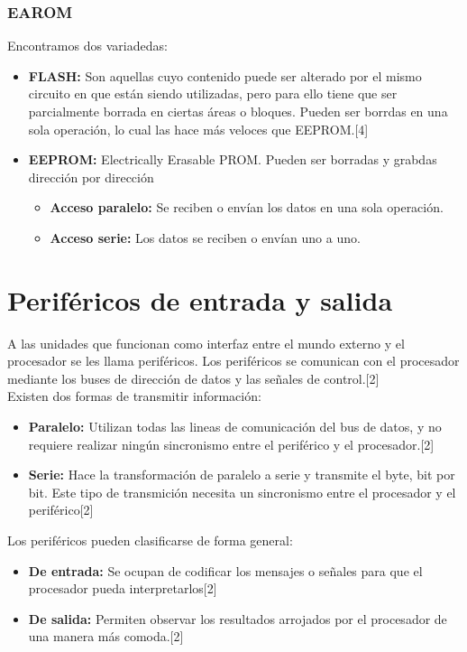 \subsubsection{EAROM}
Encontramos dos variadedas: 
\begin{itemize}
    \item \textbf{FLASH:} Son aquellas cuyo contenido puede ser alterado por el mismo circuito en que están siendo utilizadas, pero para ello tiene que ser parcialmente borrada en ciertas áreas o bloques. Pueden ser borrdas en una sola operación, lo cual las hace más veloces que EEPROM.[4]
    
    \item \textbf{EEPROM:} Electrically Erasable PROM. Pueden ser borradas y grabdas dirección por dirección
    \begin{itemize}
        \item \textbf{Acceso paralelo:} Se reciben o envían los datos en una sola operación.
    
        \item \textbf{Acceso serie:} Los datos se reciben o envían uno a uno.
    \end{itemize}
\end{itemize}

\section{Periféricos de entrada y salida}
A las unidades que funcionan como interfaz entre el mundo externo y el procesador se les llama periféricos. Los periféricos se comunican con el procesador mediante los buses de dirección de datos y las señales de control.[2]\\ Existen dos formas de transmitir información:
\begin{itemize}
    \item \textbf{Paralelo:} Utilizan todas las lineas de comunicación del bus de datos, y no requiere realizar ningún sincronismo entre el periférico y el procesador.[2]
    \item \textbf{Serie:} Hace la transformación de paralelo a serie y transmite el byte, bit por bit. Este tipo de transmición necesita un sincronismo entre el procesador y el periférico[2]
\end{itemize}
Los periféricos pueden clasificarse de forma general:
\begin{itemize}
    \item \textbf{De entrada:} Se ocupan de codificar los mensajes o señales para que el procesador pueda interpretarlos[2]
    \item \textbf{De salida:} Permiten observar los resultados arrojados por el procesador de una manera más comoda.[2]
\end{itemize}


